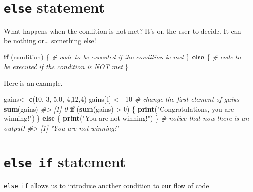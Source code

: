 \documentclass[]{book}
\newenvironment{Shaded}{}{}
\newcommand{\CommentTok}[1]{\textcolor[rgb]{0.38,0.63,0.69}{\textit{#1}}}
\newcommand{\ControlFlowTok}[1]{\textcolor[rgb]{0.00,0.44,0.13}{\textbf{#1}}}
\newcommand{\DecValTok}[1]{\textcolor[rgb]{0.25,0.63,0.44}{#1}}
\newcommand{\KeywordTok}[1]{\textcolor[rgb]{0.00,0.44,0.13}{\textbf{#1}}}
\newcommand{\NormalTok}[1]{#1}
\newcommand{\OperatorTok}[1]{\textcolor[rgb]{0.40,0.40,0.40}{#1}}
\newcommand{\StringTok}[1]{\textcolor[rgb]{0.25,0.44,0.63}{#1}}
\theoremstyle{definition}
\theoremstyle{definition}
\theoremstyle{definition}
\theoremstyle{remark}
\begin{document}
\hypertarget{else-statement}{%
\section{\texorpdfstring{\texttt{else}
statement}{else statement}}\label{else-statement}}

What happens when the condition is not met? It's on the user to decide.
It can be nothing or\ldots{} something else!

\begin{Shaded}
\begin{Highlighting}[]
\ControlFlowTok{if}\NormalTok{ (condition) \{ }
\CommentTok{# code to be executed if the condition is met}
\NormalTok{\} }\ControlFlowTok{else}\NormalTok{ \{}
\CommentTok{# code to be executed if the condition is NOT met}
\NormalTok{\}}
\end{Highlighting}
\end{Shaded}

Here is an example.

\begin{Shaded}
\begin{Highlighting}[]
\NormalTok{gains<-}\StringTok{ }\KeywordTok{c}\NormalTok{(}\DecValTok{10}\NormalTok{, }\DecValTok{3}\NormalTok{,}\OperatorTok{-}\DecValTok{5}\NormalTok{,}\DecValTok{0}\NormalTok{,}\OperatorTok{-}\DecValTok{4}\NormalTok{,}\DecValTok{12}\NormalTok{,}\DecValTok{4}\NormalTok{)}
\NormalTok{gains[}\DecValTok{1}\NormalTok{] <-}\StringTok{ }\DecValTok{-10} \CommentTok{# change the first element of gains}
\KeywordTok{sum}\NormalTok{(gains)}
\CommentTok{#> [1] 0}
\ControlFlowTok{if}\NormalTok{ (}\KeywordTok{sum}\NormalTok{(gains) }\OperatorTok{>}\StringTok{ }\DecValTok{0}\NormalTok{) \{}
  \KeywordTok{print}\NormalTok{(}\StringTok{"Congratulations, you are winning!"}\NormalTok{)}
\NormalTok{\} }\ControlFlowTok{else}\NormalTok{ \{}
  \KeywordTok{print}\NormalTok{(}\StringTok{"You are not winning!"}\NormalTok{)}
\NormalTok{\} }\CommentTok{# notice that now there is an output!}
\CommentTok{#> [1] "You are not winning!"}
\end{Highlighting}
\end{Shaded}

\hypertarget{else-if-statement}{%
\section{\texorpdfstring{\texttt{else\ if}
statement}{else if statement}}\label{else-if-statement}}

\texttt{else\ if} allows us to introduce another condition to our flow
of code
\end{document}

